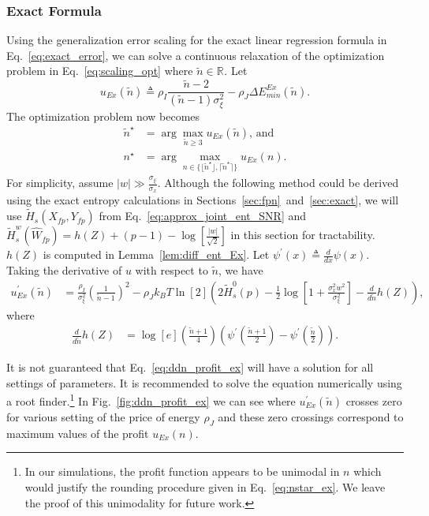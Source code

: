 \documentclass[12pt,onecolumn, margin=1in]{IEEEtran}
\newcommand{\bracket}[1]{\left[ #1 \right]}
\newcommand{\paren}[1]{\left( #1 \right)}
\newcommand{\R}[1]{\mathbb{R}^{#1}}
\newcommand{\Wh}{\hat{W}}
\newcommand{\sigx}{\sigma_x}
\newcommand{\sigxi}{\sigma_\xi}
\newcommand{\Ht}{\tilde{H}}
\newcommand{\Xfp}{X_{fp}}
\newcommand{\Yfp}{Y_{fp}}
\begin{document}
\subsubsection{Exact Formula}
Using the generalization error scaling for the exact linear regression formula in Eq.~\eqref{eq:exact_error}, we can solve a continuous relaxation of the optimization problem in Eq.~\eqref{eq:scaling_opt} where $\tilde n \in \R{}$. Let \begin{equation}\label{eq:u_ex}
u_{Ex}(\tilde n) \triangleq \rho_I\frac{\tilde n-2}{(\tilde n-1)\sigxi^2} - \rho_{J}\Delta E_{min}^{Ex}\paren{\tilde n}.
\end{equation}
 The optimization problem now becomes
\begin{align}
    \tilde n^\star &= \arg\max\limits_{\tilde n \geq 3} u_{Ex}(\tilde n) \text{, and } \nonumber\\
    n^\star &= \arg\max_{n\in\{\lfloor \tilde n^\star\rfloor,\lceil \tilde n^\star\rceil\}} u_{Ex}(n)\label{eq:nstar_ex}.
\end{align}
For simplicity, assume $|w| \gg \frac{\sigxi}{\sigx}$. Although the following method could be derived using the exact entropy calculations in Sections~\ref{sec:fpn}~and~\ref{sec:exact}, we will use $\tilde H_s(\Xfp, \Yfp)$ from Eq.~\eqref{eq:approx_joint_ent_SNR} and $\tilde H^w_s(\Wh_{fp}) = h(Z) + (p-1) -\log\bracket{\frac{|w|}{\sqrt{2}}}$ in this section for tractability. $h(Z)$ is computed in Lemma~\ref{lem:diff_ent_Ex}. Let $\psi^\prime(x) \triangleq \frac{d}{dx}\psi(x)$. Taking the derivative of $u$ with respect to $\tilde n$, we have
\begin{align}
    u^\prime_{Ex} (\tilde n) &= \frac{\rho_I}{\sigxi^2}\paren{\frac{1}{\tilde n-1}}^2\nonumber - \rho_J k_BT \ln[2] \paren{2\Ht^0_{s}(p) - \frac{1}{2}\log\bracket{ 1 + \frac{\sigma^2_x w^2}{\sigma_\xi^2}}- \frac{d}{d\tilde n}h(Z)}\label{eq:ddn_profit_ex},
\end{align}
where
\begin{align}
    \frac{d}{d\tilde n}h(Z) &= \log\bracket{e}\paren{\frac{\tilde n+1}{4} }\left(\psi^\prime\left(\frac{\tilde n+1}{2}\right)-\psi^\prime\left(\frac{\tilde n}{2}\right)\right).
\end{align}

It is not guaranteed that Eq.~\eqref{eq:ddn_profit_ex} will have a solution for all settings of parameters. It is recommended to solve the equation numerically using a root finder.\footnote{In our simulations, the profit function appears to be unimodal in $n$ which would justify the rounding procedure given in Eq.~\eqref{eq:nstar_ex}. We leave the proof of this unimodality for future work.} In Fig.~\ref{fig:ddn_profit_ex} we can see where $u^\prime_{Ex} (\tilde n)$ crosses zero for various setting of the price of energy $\rho_J$ and these zero crossings correspond to maximum values of the profit $u_{Ex}(n)$.
\end{document}
